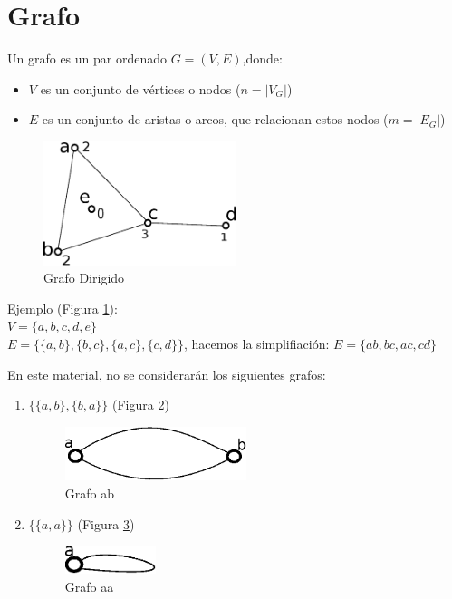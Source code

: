 \section{Grafo}
\begin{definicion}
\label{"grafo conexo"}
Un grafo es un par ordenado $G=(V,E)$,donde:
\begin{itemize}
\item $V$ es un conjunto de vértices o nodos ($n=|V_G|$)
\item $E$ es un conjunto de aristas o arcos, que relacionan estos nodos
($m=|E_G|$)
\end{itemize}
\begin{figure}
  \centering
      \includegraphics[width=0.5\textwidth]{imagen/grafo1}
  \caption{Grafo Dirigido}
  \label{fig:grafo1}
\end{figure}

Ejemplo (Figura \ref{fig:grafo1}):\\
$V=\{a,b,c,d,e\}$\\
$E=\{\{a,b\},\{b,c\},\{a,c\},\{c,d\}\}$, hacemos la simplifiación:  $E=\{ab,bc,ac,cd\}$ \\
\end{definicion}
En este material, no se considerarán los siguientes grafos:
\begin{enumerate}
\item $\{\{a,b\},\{b,a\}\}$ (Figura \ref{fig:ab})
\begin{figure}
  \centering
    \includegraphics[width=0.5\textwidth]{imagen/grafoabab}
  \caption{Grafo ab}
  \label{fig:ab}
\end{figure}

\item $\{\{a,a\}\}$ (Figura \ref{fig:aa})
\begin{figure}
  \centering
    \includegraphics[width=0.25\textwidth]{imagen/grafoaa}
  \caption{Grafo aa}
  \label{fig:aa}
\end{figure}
\end{enumerate}
